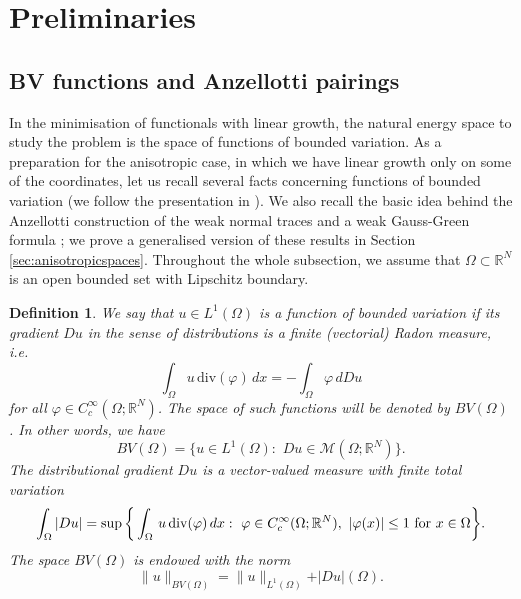\documentclass[reqno,12pt]{amsart}
\newtheorem{definition}[theorem]{Definition}
\def\R{\mathbb R}
\numberwithin{equation}{section}
\begin{document}
\section{Preliminaries}\label{sec:preliminaries}


\subsection{BV functions and Anzellotti pairings}\label{sec:anzellotti}

In the minimisation of functionals with linear growth, the natural energy space to study the problem is the space of functions of bounded variation. As a preparation for the anisotropic case, in which we have linear growth only on some of the coordinates, let us recall several facts concerning functions of bounded variation (we follow the presentation in \cite{AFP}). We also recall the basic idea behind the Anzellotti construction of the weak normal traces and a weak Gauss-Green formula \cite{Anzellotti}; we prove a generalised version of these results in Section \ref{sec:anisotropicspaces}. Throughout the whole subsection, we assume that $\Omega \subset \R^N$ is an open bounded set with Lipschitz boundary.

\begin{definition}{\rm
We say that $u \in L^1(\Omega)$ is a function of bounded variation if its gradient $Du$ in the sense of distributions is a finite (vectorial) Radon measure, i.e.
\begin{equation}
\int_{\Omega} u \, \mathrm{div}(\varphi) \, dx = -\int_{\Omega} \varphi \, d Du
\end{equation}
for all $\varphi \in C_c^{\infty}(\Omega; \mathbb{R}^N)$. The space of such functions will be denoted by $BV(\Omega)$. In other words, we have
\begin{equation}
BV(\Omega) = \bigg\{ u \in L^1(\Omega): \,\, Du \in \mathcal{M}(\Omega; \R^{N}) \bigg\}.
\end{equation}
The distributional gradient $Du$ is a vector-valued measure with finite total variation
\begin{equation}
\int_\Omega |Du| = \sup \bigg\{ \int_{\Omega} \, u \, \mathrm{div} (\varphi) \, dx: \,\, \varphi \in C_c^{\infty}(\Omega; \R^N), \,\, |\varphi(x)| \leq 1
\, \, \hbox{for $x \in \Omega$} \bigg\}.
\end{equation}
The space $BV(\Omega)$ is endowed with the norm
\begin{equation}
\| u \|_{BV(\Omega)} = \| u \|_{L^1(\Omega)} +
\vert  Du \vert (\Omega).
\end{equation}
}
\end{definition}
\end{document}
